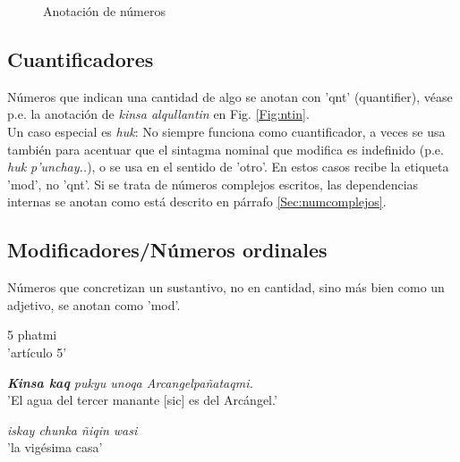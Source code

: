 \documentclass[a4paper,11pt,DIV12]{scrartcl}
\begin{document}
\begin{figure}
\begin{center}
 \caption{Anotaci\'on de n\'umeros}\label{Fig:2241}
\end{center}
\end{figure}
  \subsection{Cuantificadores}
  N\'umeros que indican una cantidad de algo se anotan con 'qnt' (quantifier), v\'ease p.e. la anotaci\'on de {\em kinsa alqullantin} en Fig. \ref{Fig:ntin}.\\
  Un caso especial es {\em huk}: No siempre funciona como cuantificador, a veces se usa tambi\'en para acentuar que el sintagma nominal que modifica es indefinido (p.e. {\em huk p'unchay..}), o se usa en el sentido de 'otro'. En estos casos recibe la etiqueta 'mod', no 'qnt'.
Si se trata de n\'umeros complejos escritos, las dependencias internas se anotan como est\'a descrito en p\'arrafo \ref{Sec:numcomplejos}.

\subsection{Modificadores/N\'umeros ordinales}\label{Sec:numord}
N\'umeros que concretizan un sustantivo, no en cantidad, sino m\'as bien como un adjetivo, se anotan como 'mod'. 
\begin{examples}
 \item {5{\textordmasculine} phatmi}\\
	'art\'iculo 5{\textordmasculine}'
 \item\label{Ex:numordKaq} {\em \textbf{Kinsa kaq} pukyu unoqa Arcangelpañataqmi.}\\
	'El agua del tercer manante [sic] es del Arcángel.'\\
		\hfill{\small \citep{Valderrama77}}
 \item {\em iskay chunka \~niqin wasi}\\
      'la vig\'esima casa'
\end{examples}
\end{document}

